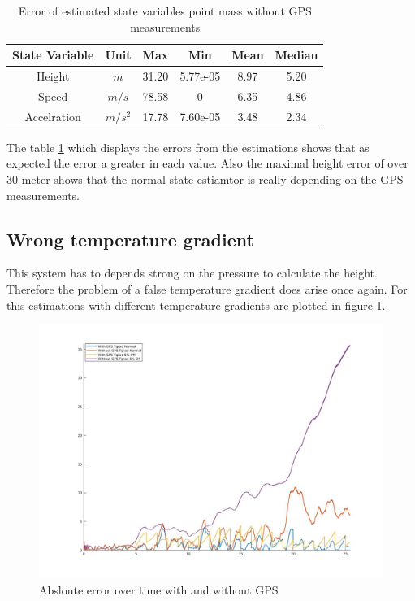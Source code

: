\begin{table}[h!]
\centering
\begin{tabular}{cccccc}
\hline
\multicolumn{1}{|c|}{State Variable} & \multicolumn{1}{c|}{Unit} & \multicolumn{1}{c|}{Max} & \multicolumn{1}{c|}{Min} & \multicolumn{1}{c|}{Mean} & \multicolumn{1}{c|}{Median} \\ \hline
Height                            & $m$                         & 31.20                  & 5.77e-05                 & 8.97                    & 5.20                      \\
Speed                             & $m/s$                       & 78.58                  & 0                        & 6.35                    & 4.86                      \\
Accelration                       & $m/s^2$   			& 17.78                  & 7.60e-05                 & 3.48                    & 2.34                     
\end{tabular}
\caption{Error of estimated state variables point mass without GPS measurements}
\label{tab:ErrorPointMassWithoutGPS}
\end{table}

The table \ref{tab:ErrorPointMassWithoutGPS} which displays the errors from the estimations shows that as expected the error a greater in each value.
Also the maximal height error of over 30 meter shows that the normal state estiamtor is really depending on the GPS measurements.

\subsection{Wrong temperature gradient}
This system has to depends strong on the pressure to calculate the height.
Therefore the problem of a false temperature gradient does arise once again.
For this estimations with different temperature gradients are plotted in figure \ref{fig:PointMassWithWithoutGPS}. 

\begin{figure}[h!]
 \centering
 \includegraphics[width=.8\textwidth]{./Pictures/PointMassWithWithoutGPS.jpg}
 \caption{Absloute error over time with and without GPS}
 \label{fig:PointMassWithWithoutGPS}
\end{figure}

